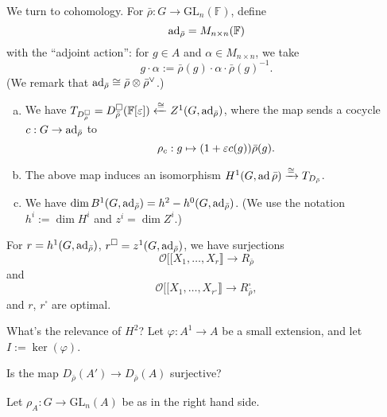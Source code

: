 \documentclass[reqno]{amsart} 
\begin{document}
We turn to cohomology.  For $\bar{\rho} : G \rightarrow \mathrm{GL}_n(\mathbb{F})$, define
\begin{equation*}
  \operatorname{ad}_{\bar{\rho}} = M_{n \times n}(\mathbb{F})
\end{equation*}
with the ``adjoint action'': for $g \in A$ and $\alpha \in M_{n \times n}$, we take
\begin{equation*}
  g \cdot \alpha := \bar{\rho}(g) \cdot \alpha \cdot \bar{\rho}(g)^{-1}.
\end{equation*}
(We remark that $\operatorname{ad}_{\bar{\rho}} \cong \bar{\rho} \otimes \bar{\rho}^\vee$.)
\begin{proposition}
  \begin{enumerate}[(a)]
  \item We have $T_{D_\rho^{\square}} = D_{\bar{\rho}}^{\square}(\mathbb{F}[\varepsilon]) \xleftarrow{\cong} Z^1(G, \operatorname{ad}_{\bar{\rho}})$, where the map sends a cocycle $c : G \rightarrow \operatorname{ad}_{\bar{\rho}}$ to
    \begin{equation*}
      \rho_c : g \mapsto(1 + \varepsilon c(g)) \bar{\rho}(g).
    \end{equation*}
  \item The above map induces an isomorphism $H^1(G, \operatorname{ad} \bar{\rho}) \xrightarrow{\cong} T_{D_{\bar{\rho}}}$.
  \item We have $\dim B^1(G, \operatorname{ad}_{\bar{\rho}}) = h^2 - h^0(G, \operatorname{ad}_{\bar{\rho}})$.  (We use the notation $h^i := \dim H^i$ and $z^i = \dim Z^i$.)
  \end{enumerate}
\end{proposition}
\begin{corollary}
  For $r = h^1(G, \operatorname{ad}_{\bar{\rho}})$, $r^{\square} = z^1(G, \operatorname{ad}_{\bar{\rho}})$, we have surjections
  \begin{equation*}
    \mathcal{O} [[ X_1, \dotsc, X_r \rrbracket \rightarrow R_{\bar{\rho}}
  \end{equation*}
  and
  \begin{equation*}
    \mathcal{O} [[ X_1, \dotsc, X_{r^{\square}} \rrbracket \rightarrow R_{\bar{\rho}}^{\square},
  \end{equation*}
  and $r$, $r^{\square}$ are optimal.
\end{corollary}
What's the relevance of $H^2$?  Let $\varphi : A^1 \rightarrow A$ be a small extension, and let $I := \ker(\varphi)$.
\begin{question}
  Is the map $D_{\bar{\rho}}(A') \rightarrow D_{\bar{\rho}}(A)$ surjective?
\end{question}
Let $\rho_A : G \rightarrow \mathrm{GL}_n(A)$ be as in the right hand side.
\end{document}
